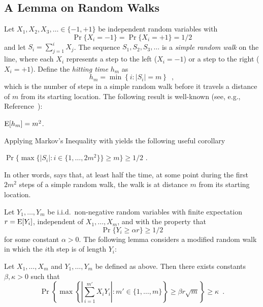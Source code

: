 \documentclass{patmorin}
\begin{document}

\subsection{A Lemma on Random Walks}

Let $X_1,X_2,X_3,\ldots\in\{-1,+1\}$ be independent random variables with
\[ \Pr\{X_i=-1\}=\Pr\{X_i=+1\}=1/2
\]
and let $S_i=\sum_{j=1}^i X_j$.  The sequence $S_1,S_2,S_3,\ldots$ is
a \emph{simple random walk} on the line, where each $X_i$ represents a
step to the left ($X_i=-1$) or a step to the right ($X_i=+1$).
Define the \emph{hitting time} $h_m$ as
\[
   h_m = \min\left\{i:|S_i|= m\right\} \enspace ,
\]
which is the number of steps in a simple random walk
before it travels a distance of $m$ from its starting location.
The following result is well-known (see, e.g.,
Reference~\cite{mu05}):
\begin{lem}
$\mathrm{E}[h_m] = m^2$.
\end{lem}
Applying Markov's Inequality with  yields the
following useful corollary
\begin{cor}
$\Pr\{\max\{|S_i|:i\in\{1,\ldots,2m^2\}\} \ge m\} \ge 1/2$ .
\end{cor}
In other words,  says that, at least half the
time, at some point
during the first $2m^2$ steps of a simple random walk, the 
walk is at distance $m$ from its starting
location.

Let $Y_1,\ldots,Y_m$ be i.i.d.\
non-negative random variables with finite expectation $r=\mathrm{E}[Y_i]$,
independent of $X_1,\ldots,X_m$, and with the
property that 
\[ \Pr\{Y_i \ge \alpha r\} \ge 1/2 \]
for some constant
$\alpha > 0$.  The following lemma considers a modified random walk in
which the $i$th step is of length $Y_i$:
\begin{lem}
Let $X_1,\ldots,X_m$ and $Y_1,\ldots,Y_m$ be defined as above.  Then
there exists constants $\beta,\kappa>0$ such that
\[
  \Pr\left\{\max\left\{
           \left|\sum_{i=1}^{m'} X_iY_i\right| : m'\in\{1,\ldots,m\}\right\}
            \ge \beta r\sqrt{m}\right\} 
     \ge \kappa \enspace .
\]
\end{lem}
\end{document}
